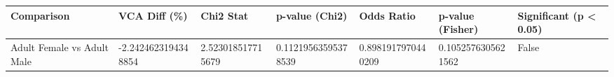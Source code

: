 \begin{tabular}{lllllll}
\hline
Comparison & VCA Diff (\%) & Chi2 Stat & p-value (Chi2) & Odds Ratio & p-value (Fisher) & Significant (p < 0.05) \\ \hline
Adult Female vs Adult Male & -2.2424623194348854 & 2.523018517715679 & 0.11219563595378539 & 0.8981917970440209 & 0.1052576305621562 & False \\
\hline
\end{tabular}
